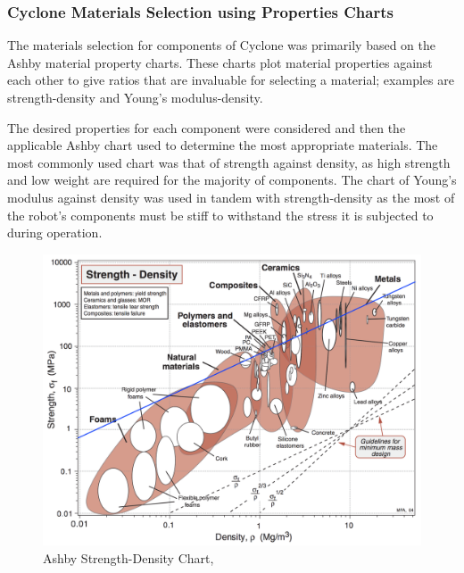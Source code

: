 \subsubsection{Cyclone Materials Selection using Properties Charts}
The materials selection for components of Cyclone was primarily based on the Ashby material property charts. These charts plot material properties against each other to give ratios that are invaluable for selecting a material; examples are strength-density and Young’s modulus-density. 

The desired properties for each component were considered and then the applicable Ashby chart used to determine the most appropriate materials. The most commonly used chart was that of strength against density, as high strength and low weight are required for the majority of components. The chart of Young’s modulus against density was used in tandem with strength-density as the most of the robot’s components must be stiff to withstand the stress it is subjected to during operation. 

\begin{figure}[h!]
\centering
\includegraphics[width=15cm]{Images/MaxImages/StrengthDensity.png}
\caption{Ashby Strength-Density Chart, \cite{Ashby05}}
\label{StrengthDensity}
\end{figure}

